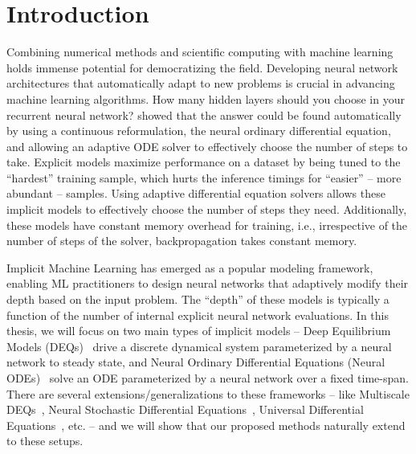 \chapter{Introduction}
\label{chapter:introduction}

Combining numerical methods and scientific computing with machine learning holds immense potential for democratizing the field. Developing neural network architectures that automatically adapt to new problems is crucial in advancing machine learning algorithms. How many hidden layers should you choose in your recurrent neural network? \citet{chen2018neural} showed that the answer could be found automatically by using a continuous reformulation, the neural ordinary differential equation, and allowing an adaptive ODE solver to effectively choose the number of steps to take. Explicit models maximize performance on a dataset by being tuned to the ``hardest'' training sample, which hurts the inference timings for ``easier'' -- more abundant -- samples. Using adaptive differential equation solvers allows these implicit models to effectively choose the number of steps they need. Additionally, these models have constant memory overhead for training, i.e., irrespective of the number of steps of the solver, backpropagation takes constant memory.

Implicit Machine Learning has emerged as a popular modeling framework, enabling ML practitioners to design neural networks that adaptively modify their depth based on the input problem. The ``depth'' of these models is typically a function of the number of internal explicit neural network evaluations. In this thesis, we will focus on two main types of implicit models -- Deep Equilibrium Models (DEQs)~\citep{bai_deep_2019} drive a discrete dynamical system parameterized by a neural network to steady state, and Neural Ordinary Differential Equations (Neural ODEs)~\citep{chen2018neural} solve an ODE parameterized by a neural network over a fixed time-span. There are several extensions/generalizations to these frameworks -- like Multiscale DEQs~\citep{bai_multiscale_2020}, Neural Stochastic Differential Equations~\citep{liu2019neural}, Universal Differential Equations~\citep{rackauckas2020universal}, etc. -- and we will show that our proposed methods naturally extend to these setups.

